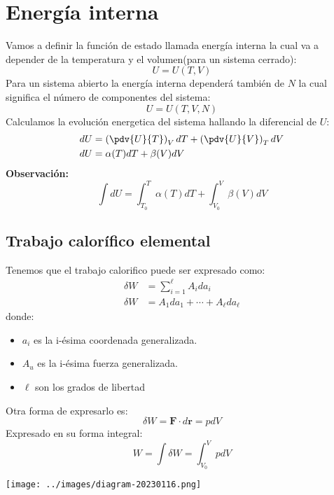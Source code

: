 \documentclass[../main]{subfiles}
\begin{document}
\chapter{Energía interna}
Vamos a definir la función  de estado llamada energía interna la cual va a depender de la temperatura y el volumen(para un sistema cerrado):
\begin{equation}
    U=U(T,V)
\end{equation}
Para un sistema abierto la energía interna dependerá también de $N$ la cual significa el número de componentes del sistema:
\begin{equation}
    U=U(T,V,N)
\end{equation}
Calculamos la evolución energetica del sistema hallando la diferencial de $U$:
\begin{align}
    dU & =\left( \pdv{U}{T} \right)_V dT + \left( \pdv{U}{V} \right)_T dV \\
    dU & =\alpha(T)dT+\beta(V)dV
\end{align}
\textbf{Observación:}
\begin{equation}
    \boxed{\int dU=\int_{T_0}^T \alpha(T)dT+\int_{V_0}^V \beta(V)dV}
\end{equation}

\section{Trabajo calorífico elemental}
Tenemos que el trabajo calorifico puede ser expresado como:
\begin{align}
    \delta W & =\sum_{i=1}^{\ell} A_i d a_i          \\
    \delta W & =A_1 da_1+\cdots + A_{\ell} da_{\ell}
\end{align}
donde:
\begin{itemize}
    \item $a_i$ es la i-ésima coordenada generalizada.
    \item $A_u$ es la i-ésima fuerza generalizada.
    \item $\ell$ son los grados de libertad
\end{itemize}
\begin{minipage}{0.49\textwidth}
    Otra forma de expresarlo es:
    \begin{equation}
        \delta W=\mathbf{F} \cdot d \mathbf{r}=pdV
    \end{equation}
    Expresado en su forma integral:
    \begin{equation}
        W=\int \delta W=\int_{V_0}^{V}p dV
    \end{equation}
\end{minipage}
\begin{minipage}{0.49\textwidth}
    \texttt{[image: ../images/diagram-20230116.png]}
\end{minipage}
\end{document}
